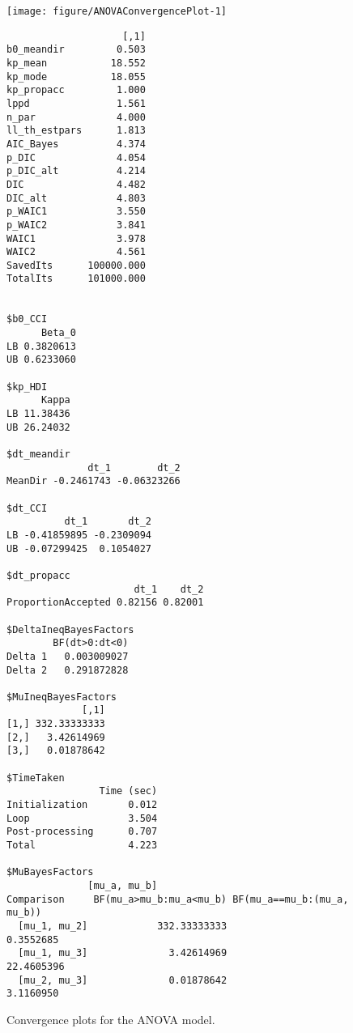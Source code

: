 \documentclass[11pt,a4paper]{article}\usepackage[]{graphicx}\usepackage[]{color}
\makeatletter
\def\maxwidth{ %
  \ifdim\Gin@nat@width>\linewidth
    \linewidth
  \else
    \Gin@nat@width
  \fi
}
\newenvironment{kframe}{%
 \def\at@end@of@kframe{}%
 \ifinner\ifhmode%
  \def\at@end@of@kframe{\end{minipage}}%
  \begin{minipage}{\columnwidth}%
 \fi\fi%
 \def\FrameCommand##1{\hskip\@totalleftmargin \hskip-\fboxsep
 \colorbox{shadecolor}{##1}\hskip-\fboxsep
     \hskip-\linewidth \hskip-\@totalleftmargin \hskip\columnwidth}%
 \MakeFramed {\advance\hsize-\width
   \@totalleftmargin\z@ \linewidth\hsize
   \@setminipage}}%
 {\par\unskip\endMakeFramed%
 \at@end@of@kframe}
\newenvironment{knitrout}{}{} %
\makeatother
\begin{document}
\begin{figure}
\begin{knitrout}
\color{fgcolor}
\texttt{[image: figure/ANOVAConvergencePlot-1]} 
\begin{kframe}\begin{verbatim}
                    [,1]
b0_meandir         0.503
kp_mean           18.552
kp_mode           18.055
kp_propacc         1.000
lppd               1.561
n_par              4.000
ll_th_estpars      1.813
AIC_Bayes          4.374
p_DIC              4.054
p_DIC_alt          4.214
DIC                4.482
DIC_alt            4.803
p_WAIC1            3.550
p_WAIC2            3.841
WAIC1              3.978
WAIC2              4.561
SavedIts      100000.000
TotalIts      101000.000


$b0_CCI
      Beta_0
LB 0.3820613
UB 0.6233060

$kp_HDI
      Kappa
LB 11.38436
UB 26.24032

$dt_meandir
              dt_1        dt_2
MeanDir -0.2461743 -0.06323266

$dt_CCI
          dt_1       dt_2
LB -0.41859895 -0.2309094
UB -0.07299425  0.1054027

$dt_propacc
                      dt_1    dt_2
ProportionAccepted 0.82156 0.82001

$DeltaIneqBayesFactors
        BF(dt>0:dt<0)
Delta 1   0.003009027
Delta 2   0.291872828

$MuIneqBayesFactors
             [,1]
[1,] 332.33333333
[2,]   3.42614969
[3,]   0.01878642

$TimeTaken
                Time (sec)
Initialization       0.012
Loop                 3.504
Post-processing      0.707
Total                4.223

$MuBayesFactors
              [mu_a, mu_b]
Comparison     BF(mu_a>mu_b:mu_a<mu_b) BF(mu_a==mu_b:(mu_a, mu_b))
  [mu_1, mu_2]            332.33333333                   0.3552685
  [mu_1, mu_3]              3.42614969                  22.4605396
  [mu_2, mu_3]              0.01878642                   3.1160950
\end{verbatim}
\end{kframe}
\end{knitrout}
\caption{Convergence plots for the ANOVA model.}
\label{ANOVAConvergencePlot}
\end{figure}

\end{document}

